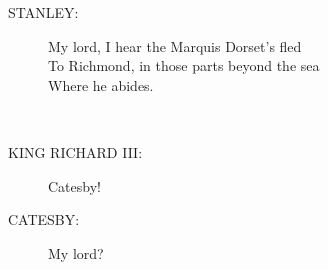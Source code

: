 \documentclass{article}
\begin{document}
\begin{description}
\item[STANLEY:] 
\hspace{1pt}My lord, I hear the Marquis Dorset's fled\\
\hspace{1pt}To Richmond, in those parts beyond the sea\\
\hspace{1pt}Where he abides.\\
\end{description}
\\
\begin{description}
\item[KING RICHARD III:] 
\hspace{1pt}Catesby!\\
\end{description}
\begin{description}
\item[CATESBY:] 
\hspace{1pt}My lord?\\
\end{description}
\end{document}
